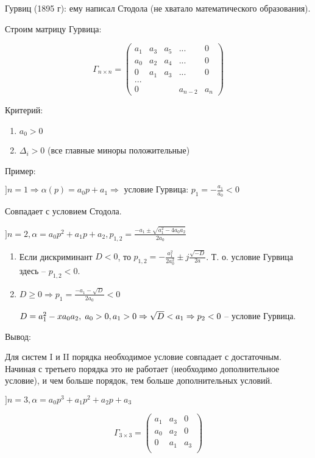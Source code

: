 \documentclass[main.tex]{subfiles}
\begin{document}
Гурвиц (1895 г): ему написал Стодола (не хватало математического образования).

Строим матрицу Гурвица:

$$ \Gamma_{n \times n} = \begin{pmatrix}
a_1 &  a_3 & a_5 & ... & 0 \\
a_0 &  a_2 & a_4 & ... & 0 \\
0   &  a_1 & a_3 & ... & 0 \\
... &&&& \\
0  &&& a_{n-2} & a_n
\end{pmatrix} $$

Критерий:

\begin{enumerate}[noitemsep]
	\item $ a_0 > 0 $
	\item $ \Delta_i > 0 $ (все главные миноры положительные)
\end{enumerate}

Пример:

$ ] n = 1 \Rightarrow \alpha(p) = a_0 p + a_1 \Rightarrow \text{ условие Гурвица: } p_1 = -\frac{a_1}{a_0} < 0 $

Совпадает с условием Стодола.

$ ] n = 2, \alpha = a_0 p^2 + a_1 p + a_2, p_{1,2} = \frac{-a_1 \pm \sqrt{a_1^2 - 4a_0 a_2}}{2a_0} $

\begin{enumerate}[noitemsep]
    \item Если дискриминант $ D < 0 $, то $ p_{1,2} = - \frac{a_1^2}{2 a_0^2} \pm j \frac{\sqrt{-D}}{2a} $.
    Т. о. условие Гурвица здесь -- $p_{1,2} < 0 $.
    \item $ D \ge 0 \Rightarrow p_1 = \frac{-a_1 - \sqrt D}{2 a_0} < 0 $

    $D = a_1^2 - x a_0 a_2, \thickspace a_0 > 0, a_1 > 0 \Rightarrow \sqrt D < a_1 \Rightarrow p_2 < 0 $ -- условие Гурвица.
\end{enumerate}



Вывод:
\begin{leftbar}
	Для систем I и II порядка необходимое условие совпадает с достаточным.
	Начиная с третьего порядка это не работает (необходимо дополнительное условие), и чем больше порядок, тем больше дополнительных условий.
\end{leftbar}

$ ] n = 3, \alpha = a_0 p^3 + a_1 p^2 + a_2 p + a_3 $

$$ \Gamma_{3\times3} = \begin{pmatrix}
a_1 & a_3 & 0 \\
a_0 & a_2 & 0 \\
0   & a_1 & a_3 \\
\end{pmatrix} $$
\end{document}
